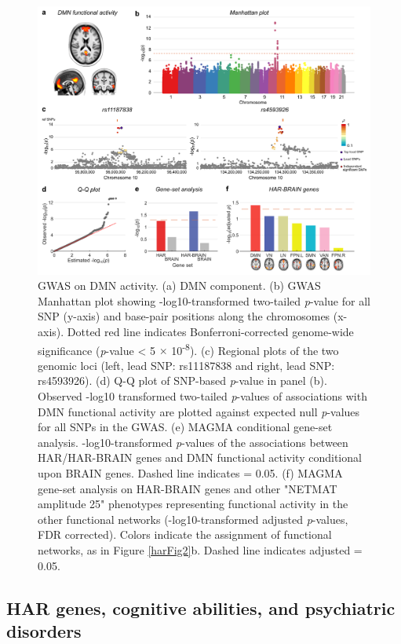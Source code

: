 \begin{refsection}
\begin{figure}[H]
    \centering
    \includegraphics[width=\linewidth]{images/harFig6.png}
    \caption{GWAS on DMN activity. (a) DMN component. (b) GWAS Manhattan plot showing -log10-transformed two-tailed \textit{p}-value for all SNP (y-axis) and base-pair positions along the chromosomes (x-axis). Dotted red line indicates Bonferroni-corrected genome-wide significance (\textit{p}-value < 5 $\times$ 10\textsuperscript{-8}). (c) Regional plots of the two genomic loci (left, lead SNP: rs11187838 and right, lead SNP: rs4593926). (d) Q-Q plot of SNP-based \textit{p}-value in panel (b). Observed -log10 transformed two-tailed \textit{p}-values of associations with DMN functional activity are plotted against expected null \textit{p}-values for all SNPs in the GWAS. (e) MAGMA conditional gene-set analysis. -log10-transformed \textit{p}-values of the associations between HAR/HAR-BRAIN genes and DMN functional activity conditional upon BRAIN genes. Dashed line indicates \pval = 0.05. (f) MAGMA gene-set analysis on HAR-BRAIN genes and other "NETMAT amplitude 25" phenotypes representing functional activity in the other functional networks (-log10-transformed adjusted \textit{p}-values, FDR corrected). Colors indicate the assignment of functional networks, as in Figure \ref{harFig2}b. Dashed line indicates adjusted \pval = 0.05.}
    \label{harFig6}
\end{figure}

\subsection*{HAR genes, cognitive abilities, and psychiatric disorders}


\end{refsection}
